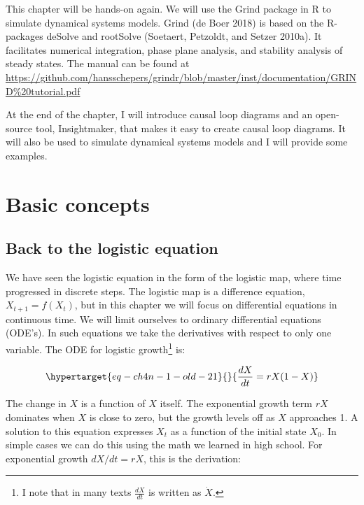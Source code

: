 \documentclass[
  a4paper,
  DIV=11,
  numbers=noendperiod,
  oneside]{scrreprt}
\begin{document}
This chapter will be hands-on again. We will use the Grind package in R
to simulate dynamical systems models. Grind (de Boer 2018) is based on
the R-packages deSolve and rootSolve (Soetaert, Petzoldt, and Setzer
2010a). It facilitates numerical integration, phase plane analysis, and
stability analysis of steady states. The manual can be found at
\url{https://github.com/hansschepers/grindr/blob/master/inst/documentation/GRIND\%20tutorial.pdf}

At the end of the chapter, I will introduce causal loop diagrams and an
open-source tool, Insightmaker, that makes it easy to create causal loop
diagrams. It will also be used to simulate dynamical systems models and
I will provide some examples.

\hypertarget{sec-Basic-concepts}{%
\section{Basic concepts}\label{sec-Basic-concepts}}

\hypertarget{sec-Back-to-the-logistic-equation}{%
\subsection{Back to the logistic
equation}\label{sec-Back-to-the-logistic-equation}}

We have seen the logistic equation in the form of the logistic map,
where time progressed in discrete steps. The logistic map is a
difference equation, \(X_{t + 1} = f(X_{t})\), but in this chapter we
will focus on differential equations in continuous time. We will limit
ourselves to ordinary differential equations (ODE's). In such equations
we take the derivatives with respect to only one variable. The ODE for
logistic growth\footnote{I note that in many texts \(\frac{dX}{dt}\) is
  written as \(\dot{X}\).} is:

\begin{equation}\protect\hypertarget{eq-ch4n-1-old-21}{}{
\frac{dX}{dt} = rX(1 - X)
}\label{eq-ch4n-1-old-21}\end{equation}

The change in \(X\) is a function of \(X\) itself. The exponential
growth term \(rX\) dominates when \(X\) is close to zero, but the growth
levels off as \(X\) approaches 1. A solution to this equation expresses
\(X_{t}\) as a function of the initial state \(X_{0}\). In simple cases
we can do this using the math we learned in high school. For exponential
growth \(dX/dt = rX\), this is the derivation:
\end{document}
